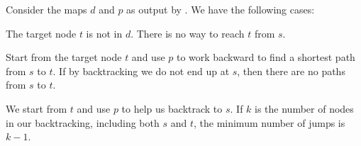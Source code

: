 \begin{algorithm}[!htbp]

\caption{%
  Dijkstra's algorithm to find a shortest path in a directed graph.
}
\label{alg:jump2:array_jumping_game_II}
\end{algorithm}

Consider the maps $d$ and $p$ as output by
.  We have the following
cases:
\begin{packedenumeral}
\item The target node $t$ is not in $d$.  There is no way to reach $t$
  from $s$.
\item Start from the target node $t$ and use $p$ to work backward to
  find a shortest path from $s$ to $t$.  If by backtracking we do not
  end up at $s$, then there are no paths from $s$ to $t$.
\item We start from $t$ and use $p$ to help us backtrack to $s$.  If
  $k$ is the number of nodes in our backtracking, including both $s$
  and $t$, the minimum number of jumps is $k - 1$.
\end{packedenumeral}
